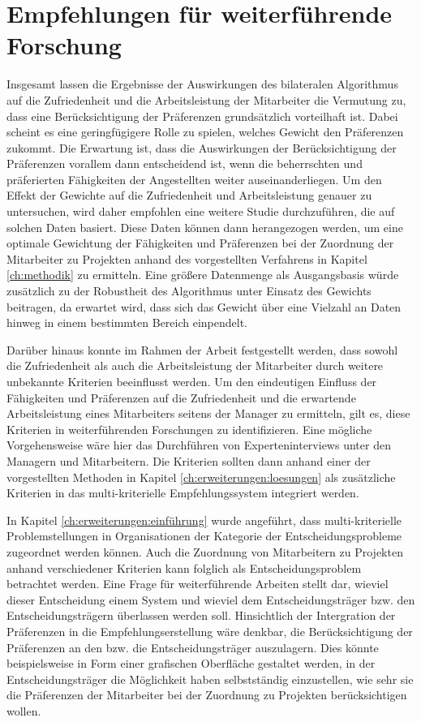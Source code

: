 \section{Empfehlungen für weiterführende Forschung}
Insgesamt lassen die Ergebnisse der Auswirkungen des bilateralen Algorithmus auf die Zufriedenheit und die Arbeitsleistung der Mitarbeiter die Vermutung zu, dass eine Berücksichtigung der Präferenzen grundsätzlich vorteilhaft ist.
Dabei scheint es eine geringfügigere Rolle zu spielen, welches Gewicht den Präferenzen zukommt.
Die Erwartung ist, dass die Auswirkungen der Berücksichtigung der Präferenzen vorallem dann entscheidend ist, wenn die beherrschten und präferierten Fähigkeiten der Angestellten weiter auseinanderliegen.
Um den Effekt der Gewichte auf die Zufriedenheit und Arbeitsleistung genauer zu untersuchen, wird daher empfohlen eine weitere Studie durchzuführen, die auf solchen Daten basiert.
Diese Daten können dann herangezogen werden, um eine optimale Gewichtung der Fähigkeiten und Präferenzen bei der Zuordnung der Mitarbeiter zu Projekten anhand des vorgestellten Verfahrens in Kapitel \ref{ch:methodik} zu ermitteln.
Eine größere Datenmenge als Ausgangsbasis würde zusätzlich zu der Robustheit des Algorithmus unter Einsatz des Gewichts beitragen, da erwartet wird, dass sich das Gewicht über eine Vielzahl an Daten hinweg in einem bestimmten Bereich einpendelt.

Darüber hinaus konnte im Rahmen der Arbeit festgestellt werden, dass sowohl die Zufriedenheit als auch die Arbeitsleistung der Mitarbeiter durch weitere unbekannte Kriterien beeinflusst werden.
Um den eindeutigen Einfluss der Fähigkeiten und Präferenzen auf die Zufriedenheit und die erwartende Arbeitsleistung eines Mitarbeiters seitens der Manager zu ermitteln, gilt es, diese Kriterien in weiterführenden Forschungen zu identifizieren.
Eine mögliche Vorgehensweise wäre hier das Durchführen von Experteninterviews unter den Managern und Mitarbeitern.
Die Kriterien sollten dann anhand einer der vorgestellten Methoden in Kapitel \ref{ch:erweiterungen:loesungen} als zusätzliche Kriterien in das multi-kriterielle Empfehlungssystem integriert werden.

In Kapitel \ref{ch:erweiterungen:einführung} wurde angeführt, dass multi-kriterielle Problemstellungen in Organisationen der Kategorie der Entscheidungsprobleme zugeordnet werden können.
Auch die Zuordnung von Mitarbeitern zu Projekten anhand verschiedener Kriterien kann folglich als Entscheidungsproblem betrachtet werden.
Eine Frage für weiterführende Arbeiten stellt dar, wieviel dieser Entscheidung einem System und wieviel dem Entscheidungsträger bzw. den Entscheidungsträgern überlassen werden soll.
Hinsichtlich der Intergration der Präferenzen in die Empfehlungserstellung wäre denkbar, die Berücksichtigung der Präferenzen an den bzw. die Entscheidungsträger auszulagern.
Dies könnte beispielsweise in Form einer grafischen Oberfläche gestaltet werden, in der Entscheidungsträger die Möglichkeit haben selbstständig einzustellen, wie sehr sie die Präferenzen der Mitarbeiter bei der Zuordnung zu Projekten berücksichtigen wollen.

